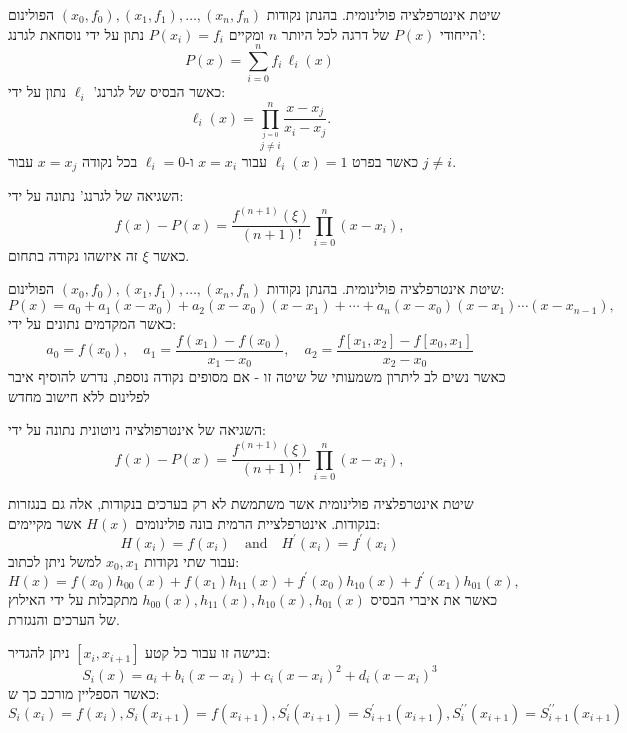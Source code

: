\documentclass{tstextbook}
\begin{document}
\begin{definition}
שיטת אינטרפלציה פולינומית. בהנתן נקודות \((x_{0},f_{0}),(x_{1},f_{1}),\dots,(x_{n},f_{n})\) הפולינום הייחודי \(P(x)\) של דרגה לכל היותר \(n\) ומקיים \(P(x_{i})=f_{i}\) נתון על ידי נוסחאת לגרנג':
$$P(x)=\sum_{i=0}^{n}f_{i}\,\ell_{i}(x)$$
כאשר הבסיס של לגרנג' \(\ell_{i}\) נתון על ידי:
$$\ell_{i}(x)=\prod_{\stackrel{j=0}{j\neq i}}^{n}{\frac{x-x_{j}}{x_{i}-x_{j}}}.$$
כאשר בפרט \(\ell_{i}(x)=1\) עבור \(x=x_{i}\) ו-\(\ell_{i}=0\) בכל נקודה \(x=x_{j}\) עבור \(j\neq i\).

\end{definition}
\begin{proposition}
השגיאה של לגרנג' נתונה על ידי:
$$f(x)-P(x)={\frac{f^{(n+1)}(\xi)}{(n+1)!}}\prod_{i=0}^{n}(x-x_{i}),$$
כאשר \(\xi\) זה איזשהו נקודה בתחום.

\end{proposition}
\begin{definition}
שיטת אינטרפלציה פולינומית. בהנתן נקודות \((x_{0},f_{0}),(x_{1},f_{1}),\dots,(x_{n},f_{n})\) הפולינום:
$$P(x)=a_{0}+a_{1}(x-x_{0})+a_{2}(x-x_{0})(x-x_{1})+\cdots+a_{n}(x-x_{0})(x-x_{1})\cdots(x-x_{n-1}),$$
כאשר המקדמים נתונים על ידי:
$$a_{0}=f(x_{0}),\quad a_{1}=\frac{f(x_{1})-f(x_{0})}{x_{1}-x_{0}},\quad a_{2}=\frac{f[x_{1},x_{2}]-f[x_{0},x_{1}]}{x_{2}-x_{0}}$$
כאשר נשים לב ליתרון משמעותי של שיטה זו - אם מסופים נקודה נוספת, נדרש להוסיף איבר לפלינום ללא חישוב מחדש

\end{definition}
\begin{proposition}
השגיאה של אינטרפולציה ניוטונית נתונה על ידי:
$$f(x)-P(x)={\frac{f^{(n+1)}(\xi)}{(n+1)!}}\prod_{i=0}^{n}(x-x_{i}),$$

\end{proposition}
\begin{definition}
שיטת אינטרפלציה פולינומית אשר משתמשת לא רק בערכים בנקודות, אלה גם בנגזרות בנקודות. אינטרפלציית הרמית בונה פולינומים \(H(x)\) אשר מקיימים:
$$H(x_{i})=f(x_{i})\quad{\mathrm{and}}\quad H^{\prime}(x_{i})=f^{\prime}(x_{i})$$
עבור שתי נקודות \(x_{0},x_{1}\) למשל ניתן לכתוב:
$$H(x)=f(x_{0})h_{00}(x)+f(x_{1})h_{11}(x)+f^{\prime}(x_{0})h_{10}(x)+f^{\prime}(x_{1})h_{01}(x),$$
כאשר את איברי הבסיס \(h_{00}(x),h_{11}(x),h_{10}(x),h_{01}(x)\) מתקבלות על ידי האילוץ של הערכים והנגזרת.

\end{definition}
\begin{definition}
בגישה זו עבור כל קטע \([x_{i},x_{i+1}]\) ניתן להגדיר:
$$S_{i}(x)=a_{i}+b_{i}(x-x_{i})+c_{i}(x-x_{i})^{2}+d_{i}(x-x_{i})^{3}$$
כאשר הספליין מורכב כך ש:
$$S_{i}(x_{i})=f(x_{i}),S_{i}(x_{i+1})=f(x_{i+1}),S_{i}^{\prime}(x_{i+1})=S_{i+1}^{\prime}(x_{i+1}),S_{i}^{\prime\prime}(x_{i+1})=S_{i+1}^{\prime\prime}(x_{i+1})$$

\end{definition}
\end{document}
